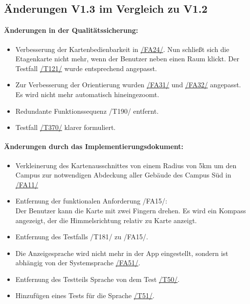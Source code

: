 \subsection*{Änderungen V1.3 im Vergleich zu V1.2}
\paragraph*{Änderungen in der Qualitätssicherung:}
\begin{itemize}
    \item Verbesserung der Kartenbedienbarkeit in \hyperref[/FA24/]{/FA24/}. Nun schließt sich die Etagenkarte nicht mehr, wenn der Benutzer neben einen Raum klickt. Der Testfall \hyperref[/T121/]{/T121/} wurde entsprechend angepasst.
    \item Zur Verbesserung der Orientierung wurden \hyperref[/FA31/]{/FA31/} und \hyperref[/FA32/]{/FA32/} angepasst. Es wird nicht mehr automatisch hineingezoomt.
    \item Redundante Funktionssequenz /T190/ entfernt.
    \item Testfall \hyperref[/T370/]{/T370/} klarer formuliert.
\end{itemize}

\paragraph*{Änderungen durch das Implementierungsdokument:}
\begin{itemize}
    \item Verkleinerung des Kartenausschnittes von einem Radius von 5km um den \Gls{Campus} zur notwendigen Abdeckung aller Gebäude des \Gls{Campus} Süd in \hyperref[/FA11/]{/FA11/}
    \item Entfernung der funktionalen Anforderung /FA15/: \\ Der \Gls{Benutzer} kann die \Gls{Karte} mit zwei Fingern drehen. Es wird ein Kompass angezeigt, der die Himmelsrichtung relativ zu \Gls{Karte} anzeigt.
    \item Entfernung des Testfalls /T181/ zu /FA15/.
    \item Die Anzeigesprache wird nicht mehr in der App eingestellt, sondern ist abhängig von der Systemsprache \hyperref[/FA51/]{/FA51/}.
    \item Entfernung des Testteils Sprache von dem Test \hyperref[/T50/]{/T50/}.
    \item Hinzufügen eines Tests für die Sprache \hyperref[/T51/]{/T51/}.
\end{itemize}